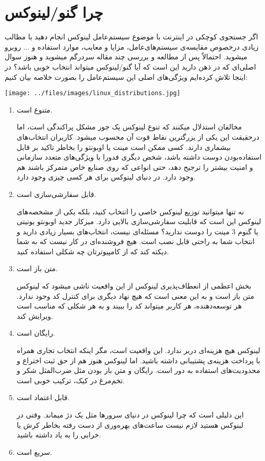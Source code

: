 \section{چرا گنو/لینوکس}
اگر جستجوی کوچکی در اینترنت با موضوع سیستم‌عامل لینوکس انجام دهید با مطالب زیادی درخصوص مقایسه‌ی سیستم‌های‌عامل، مزایا و معایب، موارد استفاده و ... روبرو میشوید. احتمالاً پس از مطالعه و بررسی چند مقاله سردرگم میشوید و هنوز سوال اصلی‌ای که در ذهن دارید این است که آیا گنو/لینوکس میتواند انتخاب خوبی باشد؟ در اینجا تلاش کرده‌ایم ویژگی‌های اصلی این سیستم‌عامل را بصورت خلاصه بیان کنیم:

\texttt{[image: ../files/images/linux\_distributions.jpg]}

\begin{enumerate}
\item متنوع است.

مخالفان استدلال میکنند که تنوع لینوکس یک جور مشکل پراکندگی است، اما درحقیقت این یکی از یزرگترین نقاط قوت آن محسوب میشود. کاربران انتخاب‌های بیشماری دارند. کسی ممکن است مینت یا اوبونتو را بخاطر تاکید بر قابل استفاده‌بودن دوست داشته باشد، شخص دیگری فدورا با ویژگی‌های متعدد سازمانی و امنیت بیشتر را ترجیح دهد، حتی انواعی که روی صنایع خاص متمرکز باشند هم وجود دارد. در دنیای لینوکس برای هر کسی چیزی وجود دارد.

\item قابل سفارشی‌سازی است.

نه تنها میتوانید توزیع لینوکس خاصی را انتخاب کنید، بلکه یکی از مشخصه‌های لینوکس این است که قابلیت سفارشی‌سازی بالایی دارد. میزکار جدید اوبونتو یونیتی یا گنوم 3 مینت را دوست ندارید؟ مسئله‌ای نیست، انتخاب‌های بسیار زیادی دارید و انتخاب شما به راحتی قابل نصب است. هیچ فروشنده‌ای در کار نیست که به شما دیکته کند که از کامپیوترتان چه شکلی استفاده کنید.
\item متن باز است.

بخش اعظمی از انعطاف‌پذیری لینوکس از این واقعیت ناشی میشود که لینوکس متن باز است و به این معنی است که هیچ نهاد دیگری برای کنترل کد وجود ندارد. هر توسعه‌دهنده، هر کاربر میتواند کد را ببیند و به هر شکلی که مناسب است ویرایش کند.
\item  رایگان است.

لینوکس هیچ هزینه‌ای دربر ندارد. این واقعیت است، مگر اینکه انتخاب تجاری همراه با پرداخت هزینه‌ی پشتیبانی داشته باشید. اما لینوکس هنوز هم از حق ثبت اختراع و محدودیت‌های استفاده به دور است. رایگان و متن باز بودن مثل ضرب‌المثل شکر و تخم‌مرغ در کیک، ترکیب خوبی است.
\item  قابل اعتماد است.

این دلیلی است که چرا لینوکس در دنیای سرورها مثل یک دژ میماند. وقتی در لینوکس هستید لازم نیست ساعت‌های بهره‌وری از دست رفته بخاطر کرش یا خرابی را به یاد داشته باشید.
\item  سریع است.


\end{enumerate}
